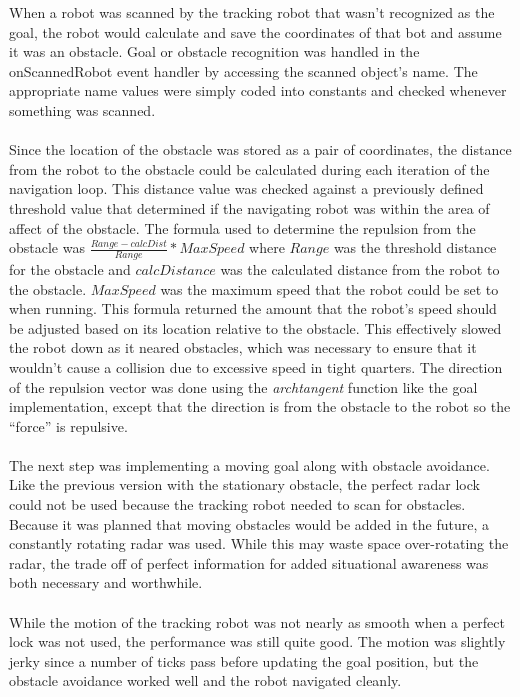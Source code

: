\documentclass{aiaa-tc}%
\begin{document}
When a robot was scanned by the tracking robot that wasn't recognized as the goal, the robot would calculate and save the coordinates of that bot and assume it was an obstacle. Goal or obstacle recognition was handled in the onScannedRobot event handler by accessing the scanned object's name. The appropriate name values were simply coded into constants and checked whenever something was scanned. \\ \\
Since the location of the obstacle was stored as a pair of coordinates, the distance from the robot to the obstacle could be calculated during each iteration of the navigation loop. This distance value was checked against a previously defined threshold value that determined if the navigating robot was within the area of affect of the obstacle. The formula used to determine the repulsion from the obstacle was $\frac{Range - calcDist}{Range} * MaxSpeed$ where $Range$ was the threshold distance for the obstacle and $calcDistance$ was the calculated distance from the robot to the obstacle. $MaxSpeed$ was the maximum speed that the robot could be set to when running. This formula returned the amount that the robot's speed should be adjusted based on its location relative to the obstacle. This effectively slowed the robot down as it neared obstacles, which was necessary to ensure that it wouldn't cause a collision due to excessive speed in tight quarters. The direction of the repulsion vector was done using the \emph{archtangent} function like the goal implementation, except that the direction is from the obstacle to the robot so the ``force'' is repulsive. \\ \\
The next step was implementing a moving goal along with obstacle avoidance. Like the previous version with the stationary obstacle, the perfect radar lock could not be used because the tracking robot needed to scan for obstacles. Because it was planned that moving obstacles would be added in the future, a constantly rotating radar was used. While this may waste space over-rotating the radar, the trade off of perfect information for added situational awareness was both necessary and worthwhile. \\ \\
While the motion of the tracking robot was not nearly as smooth when a perfect lock was not used, the performance was still quite good. The motion was slightly jerky since a number of ticks pass before updating the goal position, but the obstacle avoidance worked well and the robot navigated cleanly. \\ \\
\end{document}
